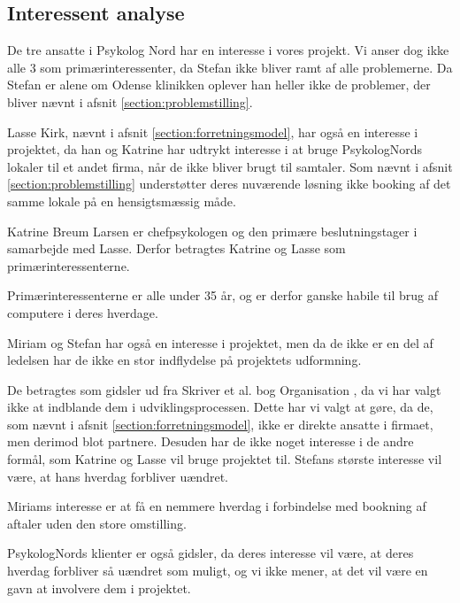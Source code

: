 \subsection{Interessent analyse}

De tre ansatte i Psykolog Nord har en interesse i vores projekt. Vi anser dog ikke alle 3 som primærinteressenter, da Stefan ikke bliver ramt af alle problemerne.
Da Stefan er alene om Odense klinikken oplever han heller ikke de problemer, der bliver nævnt i afsnit \ref{section:problemstilling}.

Lasse Kirk, nævnt i afsnit \ref{section:forretningsmodel}, har også en interesse i projektet, da han og Katrine har udtrykt interesse i at bruge PsykologNords lokaler til et andet firma, når de ikke bliver brugt til samtaler.
Som nævnt i afsnit \ref{section:problemstilling} understøtter deres nuværende løsning ikke booking af det samme lokale på en hensigtsmæssig måde.

Katrine Breum Larsen er chefpsykologen og den primære beslutningstager i samarbejde med Lasse.
Derfor betragtes Katrine og Lasse som primærinteressenterne.

Primærinteressenterne er alle under 35 år, og er derfor ganske habile til brug af computere i deres hverdage.

Miriam og Stefan har også en interesse i projektet, men da de ikke er en del af ledelsen har de ikke en stor indflydelse på projektets udformning.

De betragtes som gidsler ud fra Skriver et al. bog Organisation \cite[s. 435]{interessentanalyse}, da vi har valgt ikke at indblande dem i udviklingsprocessen.
Dette har vi valgt at gøre, da de, som nævnt i afsnit \ref{section:forretningsmodel}, ikke er direkte ansatte i firmaet, men derimod blot partnere.
Desuden har de ikke noget interesse i de andre formål, som Katrine og Lasse vil bruge projektet til. 
Stefans største interesse vil være, at hans hverdag forbliver uændret.

Miriams interesse er at få en nemmere hverdag i forbindelse med bookning af aftaler uden den store omstilling.

PsykologNords klienter er også gidsler, da deres interesse vil være, at deres hverdag forbliver så uændret som muligt, og vi ikke mener, at det vil være en gavn at involvere dem i projektet.